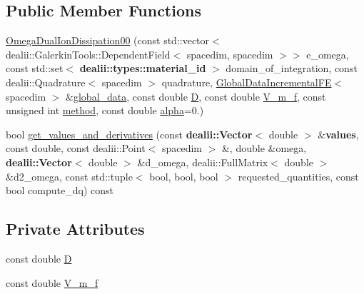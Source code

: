 \subsection*{Public Member Functions}
\begin{DoxyCompactItemize}
\item 
\hyperlink{classincremental_f_e_1_1_omega_dual_ion_dissipation00_a71bc2c3623ac5a949967fc4179d13adf}{Omega\+Dual\+Ion\+Dissipation00} (const std\+::vector$<$ dealii\+::\+Galerkin\+Tools\+::\+Dependent\+Field$<$ spacedim, spacedim $>$$>$ e\+\_\+omega, const std\+::set$<$ {\bf dealii\+::types\+::material\+\_\+id} $>$ domain\+\_\+of\+\_\+integration, const dealii\+::\+Quadrature$<$ spacedim $>$ quadrature, \hyperlink{classincremental_f_e_1_1_global_data_incremental_f_e}{Global\+Data\+Incremental\+FE}$<$ spacedim $>$ \&\hyperlink{classincremental_f_e_1_1_omega_3_01spacedim_00_01spacedim_01_4_afffe781a5a2032ec003032adc78e1bf3}{global\+\_\+data}, const double \hyperlink{classincremental_f_e_1_1_omega_dual_ion_dissipation00_a8713950f83453f5b85bfa03ffe330c68}{D}, const double \hyperlink{classincremental_f_e_1_1_omega_dual_ion_dissipation00_aeb60e6ba6608a34cdebbbdce600960bf}{V\+\_\+m\+\_\+f}, const unsigned int \hyperlink{classincremental_f_e_1_1_omega_3_01spacedim_00_01spacedim_01_4_a6c95d57122261e8a2e26d3818251bc9b}{method}, const double \hyperlink{classincremental_f_e_1_1_omega_3_01spacedim_00_01spacedim_01_4_ad881c36804cc027c301f4f069756c2db}{alpha}=0.)
\item 
bool \hyperlink{classincremental_f_e_1_1_omega_dual_ion_dissipation00_a0222bc5e8dfcc93728c230c604439332}{get\+\_\+values\+\_\+and\+\_\+derivatives} (const {\bf dealii\+::\+Vector}$<$ double $>$ \&{\bf values}, const double, const dealii\+::\+Point$<$ spacedim $>$ \&, double \&omega, {\bf dealii\+::\+Vector}$<$ double $>$ \&d\+\_\+omega, dealii\+::\+Full\+Matrix$<$ double $>$ \&d2\+\_\+omega, const std\+::tuple$<$ bool, bool, bool $>$ requested\+\_\+quantities, const bool compute\+\_\+dq) const 
\end{DoxyCompactItemize}
\subsection*{Private Attributes}
\begin{DoxyCompactItemize}
\item 
const double \hyperlink{classincremental_f_e_1_1_omega_dual_ion_dissipation00_a8713950f83453f5b85bfa03ffe330c68}{D}
\item 
const double \hyperlink{classincremental_f_e_1_1_omega_dual_ion_dissipation00_aeb60e6ba6608a34cdebbbdce600960bf}{V\+\_\+m\+\_\+f}
\end{DoxyCompactItemize}

